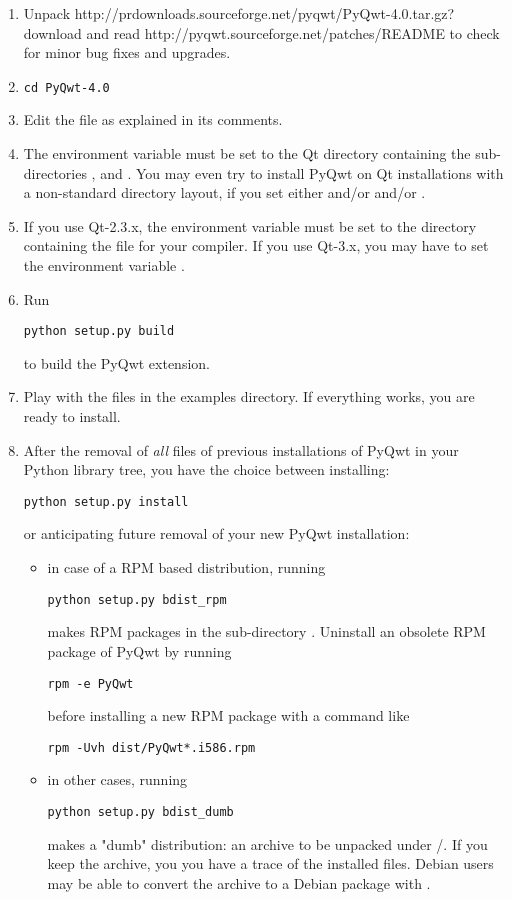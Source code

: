 \documentclass{manual}
\newcommand{\PyQwtTarGz}{\ulink{PyQwt-4.0.tar.gz}
  {http://prdownloads.sourceforge.net/pyqwt/PyQwt-4.0.tar.gz?download}}
\newcommand{\ReadMePatches}{\ulink{README}
  {http://pyqwt.sourceforge.net/patches/README}}
\begin{document}
\begin{enumerate}
\item
  Unpack \PyQwtTarGz{} and read \ReadMePatches{} to check for minor bug fixes
  and upgrades.
\item
  \begin{verbatim}
cd PyQwt-4.0
  \end{verbatim}
  {}
\item
  Edit the file  as explained in its comments.
  
\item
  The environment variable  must be set to the Qt directory
  containing the sub-directories ,  and .
  You may even try to install PyQwt on Qt installations with a non-standard
  directory layout, if you set either  and/or
   and/or .
\item
  If you use Qt-2.3.x, the environment variable  must be set
  to the directory containing the file  for your compiler.
  If you use Qt-3.x, you may have to set the environment variable
  .
\item
  Run
  \begin{verbatim}
python setup.py build
  \end{verbatim}
  to build the PyQwt extension.
\item
  Play with the  files in the examples directory.
  If everything works, you are ready to install.
\item
  After the removal of \emph{all} files of previous installations of PyQwt
  in your Python library tree, you have the choice between installing:
  \begin{verbatim}
python setup.py install
  \end{verbatim}
  or anticipating future removal of your new PyQwt installation:
  \begin{itemize}
  \item
    in case of a RPM based distribution, running
\begin{verbatim}
python setup.py bdist_rpm
\end{verbatim}
    makes RPM packages in the sub-directory .
    Uninstall an obsolete RPM package of PyQwt by running
    \begin{verbatim}
rpm -e PyQwt
    \end{verbatim}
    before installing a new RPM package with a command like
    \begin{verbatim}
rpm -Uvh dist/PyQwt*.i586.rpm
    \end{verbatim}
    {}
  \item
    in other cases, running
    \begin{verbatim}
python setup.py bdist_dumb
    \end{verbatim}
    makes a "dumb" distribution: an archive to be unpacked under /.
    If you keep the archive, you you have a trace of the installed files.
    Debian users may be able to convert the archive to a Debian package
    with .
  \end{itemize}
\end{enumerate}
\end{document}
